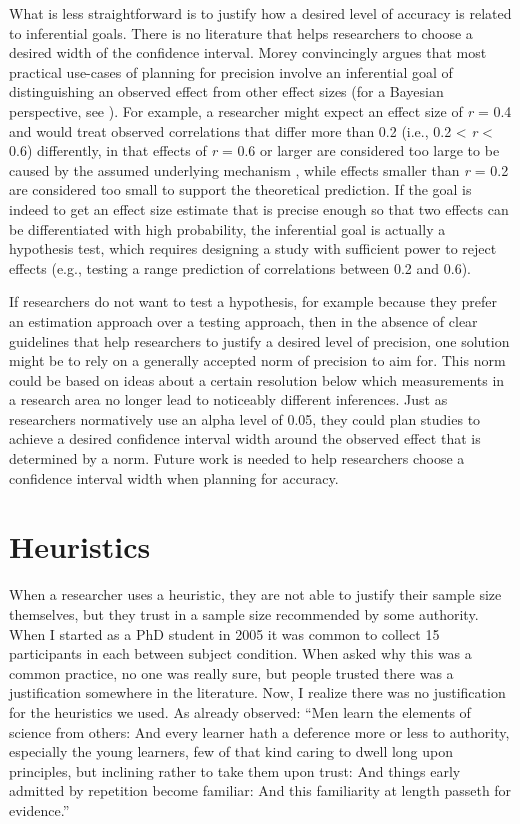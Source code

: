 \documentclass[
]{krantz}
\begin{document}
What is less straightforward is to justify how a desired level of accuracy is related to inferential goals. There is no literature that helps researchers to choose a desired width of the confidence interval. Morey \citeyearpar{morey_power_2020} convincingly argues that most practical use-cases of planning for precision involve an inferential goal of distinguishing an observed effect from other effect sizes (for a Bayesian perspective, see \citet{kruschke_rejecting_2018}). For example, a researcher might expect an effect size of \emph{r} = 0.4 and would treat observed correlations that differ more than 0.2 (i.e., 0.2 \textless{} \emph{r} \textless{} 0.6) differently, in that effects of \emph{r} = 0.6 or larger are considered too large to be caused by the assumed underlying mechanism \citep{hilgard_maximal_2021}, while effects smaller than \emph{r} = 0.2 are considered too small to support the theoretical prediction. If the goal is indeed to get an effect size estimate that is precise enough so that two effects can be differentiated with high probability, the inferential goal is actually a hypothesis test, which requires designing a study with sufficient power to reject effects (e.g., testing a range prediction of correlations between 0.2 and 0.6).

If researchers do not want to test a hypothesis, for example because they prefer an estimation approach over a testing approach, then in the absence of clear guidelines that help researchers to justify a desired level of precision, one solution might be to rely on a generally accepted norm of precision to aim for. This norm could be based on ideas about a certain resolution below which measurements in a research area no longer lead to noticeably different inferences. Just as researchers normatively use an alpha level of 0.05, they could plan studies to achieve a desired confidence interval width around the observed effect that is determined by a norm. Future work is needed to help researchers choose a confidence interval width when planning for accuracy.

\hypertarget{heuristics}{%
\section{Heuristics}\label{heuristics}}

When a researcher uses a heuristic, they are not able to justify their sample size themselves, but they trust in a sample size recommended by some authority. When I started as a PhD student in 2005 it was common to collect 15 participants in each between subject condition. When asked why this was a common practice, no one was really sure, but people trusted there was a justification somewhere in the literature. Now, I realize there was no justification for the heuristics we used. As \citet{berkeley_defence_1735} already observed: ``Men learn the elements of science from others: And every learner hath a deference more or less to authority, especially the young learners, few of that kind caring to dwell long upon principles, but inclining rather to take them upon trust: And things early admitted by repetition become familiar: And this familiarity at length passeth for evidence.''
\end{document}
